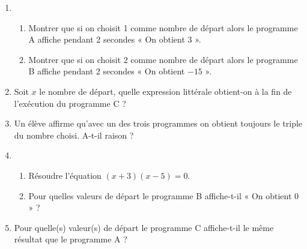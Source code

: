 \begin{enumerate}
	\item \begin{enumerate}
		\item Montrer que si on choisit 1 comme nombre de départ alors le programme A affiche pendant 2 secondes « On obtient 3 ».
		
		\item Montrer que si on choisit 2 comme nombre de départ alors le programme B affiche pendant 2 secondes « On obtient $-15$ ».
	\end{enumerate}
	
	\item Soit $x$ le nombre de départ, quelle expression littérale obtient-on à la fin de l'exécution du programme C ?
	
	\item Un élève affirme qu'avec un des trois programmes on obtient toujours le triple du nombre choisi. A-t-il raison ?
	
	\item \begin{enumerate}
		\item Résoudre l'équation $(x + 3)(x - 5) = 0$.
		
		\item Pour quelles valeurs de départ le programme B affiche-t-il « On obtient 0 » ?
	\end{enumerate}

	\item Pour quelle(s) valeur(s) de départ le programme C affiche-t-il le même résultat que le programme A ?
\end{enumerate}
\vspace{0,5cm}

